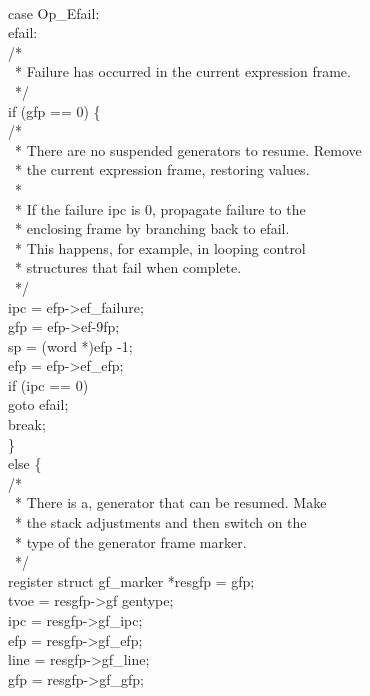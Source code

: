 \begin{iconcode}\\
\>case Op\_Efail:\\
\>efail:\\
\>\>/*\\
\>\>\ * Failure has occurred in the current expression frame.\\
\>\>\ */\\
\>\>if (gfp == 0) \{\\
\>\>\>/*\\
\>\>\>\ * There are no suspended generators to resume. Remove\\
\>\>\>\ * the current expression frame, restoring values.\\
\>\>\>\ *\\
\>\>\>\ * If the failure ipc is 0, propagate failure to the\\
\>\>\>\ * enclosing frame by branching back to efail.\\
\>\>\>\ * This happens, for example, in looping control\\
\>\>\>\ * structures that fail when complete.\\
\>\>\>\ */\\
\>\>\>ipc = efp->ef\_failure;\\
\>\>\>gfp = efp->ef-9fp;\\
\>\>\>sp = (word *)efp -1;\\
\>\>\>efp = efp->ef\_efp;\\
\>\>\>if (ipc == 0)\\
\>\>\>\>goto efail;\\
\>\>\>break;\\
\>\>\>\}\\
\>\>else \{\\
\>\>\>/*\\
\>\>\>\ * There is a, generator that can be resumed. Make\\
\>\>\>\ * the stack adjustments and then switch on the\\
\>\>\>\ * type of the generator frame marker.\\
\>\>\>\ */\\
\>\>\>register struct gf\_marker *resgfp = gfp;\\
\>\>\>tvoe = resgfp->gf gentype;\\
\>\>\>ipc = resgfp->gf\_ipc;\\
\>\>\>efp = resgfp->gf\_efp;\\
\>\>\>line = resgfp->gf\_line;\\
\>\>\>gfp = resgfp->gf\_gfp;\\

\end{iconcode}
